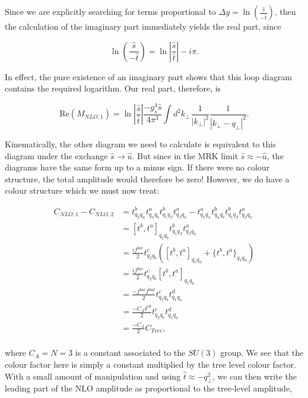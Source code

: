 Since we are explicitly searching for terms proportional to $\Delta y = \ln \left( \frac{\hat{s}}{-\hat{t}} \right)$, then the calculation of the imaginary part immediately yields the real part, since

\begin{equation}
\ln \left( \frac{\hat{s}}{-\hat{t}} \right) = \ln \left| \frac{\hat{s}}{\hat{t}} \right| - i \pi.
\end{equation}

In effect, the pure existence of an imaginary part shows that this loop diagram contains the required logarithm. Our real part, therefore, is

\begin{equation}
\text{Re}(M_{NLO,1}) = \ln \left| \frac{\hat{s}}{\hat{t}} \right| \frac{-g_s^4 \hat{s}}{ 4 \pi^3} \int d^2 k_\perp \hspace{1pt}  \frac{1}{|k_\perp|^2} \frac{1}{|k_\perp - q_\perp|^2}.
\end{equation}

Kinematically, the other diagram we need to calculate is equivalent to this diagram under the exchange $\hat{s} \to \hat{u}$. But since in the MRK limit $\hat{s} \approx -\hat{u}$, the diagrams have the same form up to a minus sign. If there were no colour structure, the total amplitude would therefore be zero! However, we do have a colour structure which we must now treat:

\begin{equation}
\begin{split}
C_{NLO,1} - C_{NLO,2} &= t^b_{q_2 q_\alpha}t^a_{q_\alpha q_b} t^b_{q_1 q_\beta} t^a_{q_\beta q_a} -  t^a_{q_2 q_\alpha}t^b_{q_\alpha q_b} t^b_{q_1 q_\beta} t^a_{q_\beta q_a}\\
& = [t^b, t^a]_{q_2 q_b} t^b_{q_1 q_\beta} t^a_{q_\beta q_a} \\
&=\frac{if^{bac}}{2}t^c_{q_2 q_b} \left([t^b,t^a]_{q_1 q_a} + \{t^b,t^a\}_{q_1 q_a} \right) \\
&= \frac{if^{bac}}{2}t^c_{q_2 q_b} [t^b,t^a]_{q_1 q_a} \\
&= \frac{-f^{bac}f^{bad}}{2}t^c_{q_2 q_b} t^d_{q_1 q_a} \\
&= \frac{-C_A \delta^{cd}}{2}t^c_{q_2 q_b} t^d_{q_1 q_a} \\
&= \frac{-C_A}{2}C_{Tree}, \\
\end{split}
\end{equation}

where $C_A = N = 3$ is a constant associated to the $SU(3)$ group. We see that the colour factor here is simply a constant multiplied by the tree level colour factor. With a small amount of manipulation and using $\hat{t} \approx -q_\perp^2$, we can then write the leading part of the NLO amplitude as proportional to the tree-level amplitude,

